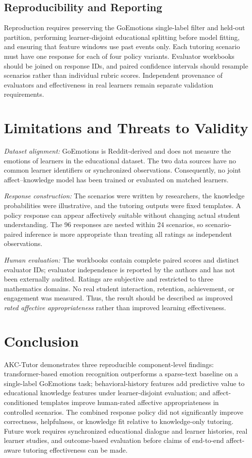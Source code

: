 \documentclass[conference]{IEEEtran}
\begin{document}
\subsection{Reproducibility and Reporting}
Reproduction requires preserving the GoEmotions single-label filter and held-out partition, performing learner-disjoint educational splitting before model fitting, and ensuring that feature windows use past events only. Each tutoring scenario must have one response for each of four policy variants. Evaluator workbooks should be joined on response IDs, and paired confidence intervals should resample scenarios rather than individual rubric scores. Independent provenance of evaluators and effectiveness in real learners remain separate validation requirements.

\section{Limitations and Threats to Validity}
\textit{Dataset alignment:} GoEmotions is Reddit-derived and does not measure the emotions of learners in the educational dataset. The two data sources have no common learner identifiers or synchronized observations. Consequently, no joint affect--knowledge model has been trained or evaluated on matched learners.

\textit{Response construction:} The scenarios were written by researchers, the knowledge probabilities were illustrative, and the tutoring outputs were fixed templates. A policy response can appear affectively suitable without changing actual student understanding. The 96 responses are nested within 24 scenarios, so scenario-paired inference is more appropriate than treating all ratings as independent observations.

\textit{Human evaluation:} The workbooks contain complete paired scores and distinct evaluator IDs; evaluator independence is reported by the authors and has not been externally audited. Ratings are subjective and restricted to three mathematics domains. No real student interaction, retention, achievement, or engagement was measured. Thus, the result should be described as improved \emph{rated affective appropriateness} rather than improved learning effectiveness.

\section{Conclusion}
AKC-Tutor demonstrates three reproducible component-level findings: transformer-based emotion recognition outperforms a sparse-text baseline on a single-label GoEmotions task; behavioral-history features add predictive value to educational knowledge features under learner-disjoint evaluation; and affect-conditioned templates improve human-rated affective appropriateness in controlled scenarios. The combined response policy did not significantly improve correctness, helpfulness, or knowledge fit relative to knowledge-only tutoring. Future work requires synchronized educational dialogue and learner histories, real learner studies, and outcome-based evaluation before claims of end-to-end affect-aware tutoring effectiveness can be made.
\end{document}
